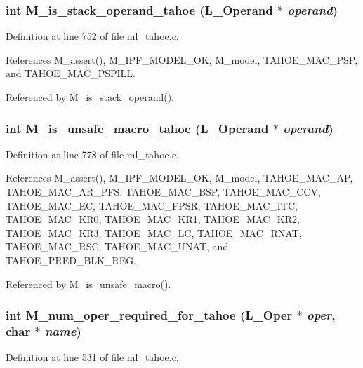 \subsubsection{\setlength{\rightskip}{0pt plus 5cm}int M\_\-is\_\-stack\_\-operand\_\-tahoe (L\_\-Operand $\ast$ {\em operand})}\label{ml__tahoe_8c_27d9dadcccb34475148be713176f24d5}




Definition at line 752 of file ml\_\-tahoe.c.

References M\_\-assert(), M\_\-IPF\_\-MODEL\_\-OK, M\_\-model, TAHOE\_\-MAC\_\-PSP, and TAHOE\_\-MAC\_\-PSPILL.

Referenced by M\_\-is\_\-stack\_\-operand().
\subsubsection{\setlength{\rightskip}{0pt plus 5cm}int M\_\-is\_\-unsafe\_\-macro\_\-tahoe (L\_\-Operand $\ast$ {\em operand})}\label{ml__tahoe_8c_66fc8d4d31ca14690c83b1223b99dc52}




Definition at line 778 of file ml\_\-tahoe.c.

References M\_\-assert(), M\_\-IPF\_\-MODEL\_\-OK, M\_\-model, TAHOE\_\-MAC\_\-AP, TAHOE\_\-MAC\_\-AR\_\-PFS, TAHOE\_\-MAC\_\-BSP, TAHOE\_\-MAC\_\-CCV, TAHOE\_\-MAC\_\-EC, TAHOE\_\-MAC\_\-FPSR, TAHOE\_\-MAC\_\-ITC, TAHOE\_\-MAC\_\-KR0, TAHOE\_\-MAC\_\-KR1, TAHOE\_\-MAC\_\-KR2, TAHOE\_\-MAC\_\-KR3, TAHOE\_\-MAC\_\-LC, TAHOE\_\-MAC\_\-RNAT, TAHOE\_\-MAC\_\-RSC, TAHOE\_\-MAC\_\-UNAT, and TAHOE\_\-PRED\_\-BLK\_\-REG.

Referenced by M\_\-is\_\-unsafe\_\-macro().
\subsubsection{\setlength{\rightskip}{0pt plus 5cm}int M\_\-num\_\-oper\_\-required\_\-for\_\-tahoe (L\_\-Oper $\ast$ {\em oper}, char $\ast$ {\em name})}\label{ml__tahoe_8c_9835bdfa6c2e962e59744b93344ee773}




Definition at line 531 of file ml\_\-tahoe.c.

